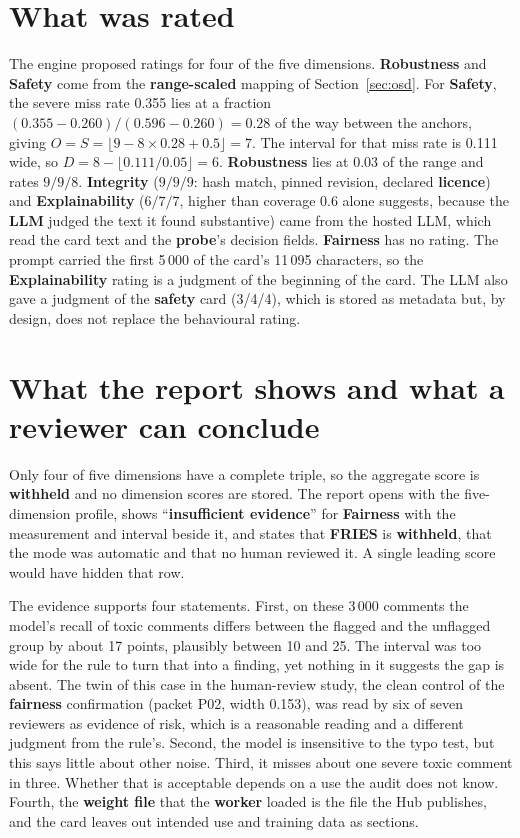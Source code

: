 \section{What was rated}
The engine proposed ratings for four of the five dimensions. \textbf{Robustness} and \textbf{Safety} come from the \textbf{range-scaled} mapping of Section~\ref{sec:osd}. For \textbf{Safety}, the severe miss rate 0.355 lies at a fraction $(0.355-0.260)/(0.596-0.260)=0.28$ of the way between the anchors, giving $O=S=\lfloor 9-8\times0.28+0.5\rfloor=7$. The interval for that miss rate is 0.111 wide, so $D=8-\lfloor0.111/0.05\rfloor=6$. \textbf{Robustness} lies at 0.03 of the range and rates $9/9/8$. \textbf{Integrity} ($9/9/9$: hash match, pinned revision, declared \textbf{licence}) and \textbf{Explainability} ($6/7/7$, higher than coverage 0.6 alone suggests, because the \textbf{LLM} judged the text it found substantive) came from the hosted LLM, which read the card text and the \textbf{probe}'s decision fields. \textbf{Fairness} has no rating. The prompt carried the first 5\,000 of the card's 11\,095 characters, so the \textbf{Explainability} rating is a judgment of the beginning of the card. The LLM also gave a judgment of the \textbf{safety} card (3/4/4), which is stored as metadata but, by design, does not replace the behavioural rating.


\section{What the report shows and what a reviewer can conclude}
Only four of five dimensions have a complete triple, so the aggregate score is \textbf{withheld} and no dimension scores are stored. The report opens with the five-dimension profile, shows ``\textbf{insufficient evidence}'' for \textbf{Fairness} with the measurement and interval beside it, and states that \textbf{FRIES} is \textbf{withheld}, that the mode was automatic and that no human reviewed it. A single leading score would have hidden that row.

The evidence supports four statements. First, on these 3\,000 comments the model's recall of toxic comments differs between the flagged and the unflagged group by about 17 points, plausibly between 10 and 25. The interval was too wide for the rule to turn that into a finding, yet nothing in it suggests the gap is absent. The twin of this case in the human-review study, the clean control of the \textbf{fairness} confirmation (packet P02, width 0.153), was read by six of seven reviewers as evidence of risk, which is a reasonable reading and a different judgment from the rule's. Second, the model is insensitive to the typo test, but this says little about other noise. Third, it misses about one severe toxic comment in three. Whether that is acceptable depends on a use the audit does not know. Fourth, the \textbf{weight file} that the \textbf{worker} loaded is the file the Hub publishes, and the card leaves out intended use and training data as sections.


